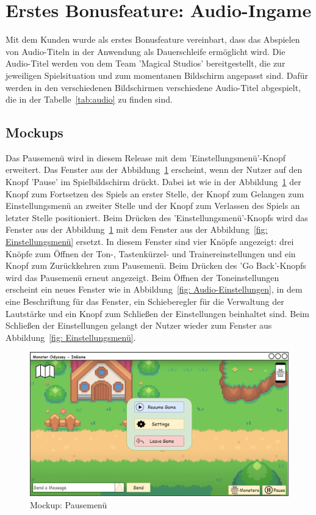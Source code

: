 \section{Erstes Bonusfeature: Audio-Ingame}\label{sec:audio-ingame}
Mit dem Kunden wurde als erstes Bonusfeature vereinbart, dass das Abspielen von Audio-Titeln in der Anwendung als Dauerschleife ermöglicht wird. 
Die Audio-Titel werden von dem Team 'Magical Studios' bereitgestellt, die zur jeweiligen Spielsituation und zum momentanen Bildschirm angepasst sind.
Dafür werden in den verschiedenen Bildschirmen verschiedene Audio-Titel abgespielt, die in der Tabelle~\ref{tab:audio} zu finden sind.
\subsection{Mockups}\label{subsec:mockups-audio-ingame}
Das Pausemenü wird in diesem Release mit dem 'Einstellungsmenü'-Knopf erweitert.
Das Fenster aus der Abbildung~\ref{fig: Pausemenü} erscheint, wenn der Nutzer auf den Knopf 'Pause' im Spielbildschirm drückt. 
Dabei ist wie in der Abbildung~\ref{fig: Pausemenü} der Knopf zum Fortsetzen des Spiels an erster Stelle, der Knopf zum Gelangen zum Einstellungsmenü an zweiter Stelle und der Knopf zum Verlassen des Spiels an letzter Stelle positioniert.
Beim Drücken des 'Einstellungsmenü'-Knopfs wird das Fenster aus der Abbildung~\ref{fig: Pausemenü} mit dem Fenster aus der Abbildung~\ref{fig: Einstellungsmenü} ersetzt. 
In diesem Fenster sind vier Knöpfe angezeigt: drei Knöpfe zum Öffnen der Ton-, Tastenkürzel- und Trainereinstellungen und ein Knopf zum Zurückkehren zum Pausemenü. Beim Drücken des 'Go Back'-Knopfs wird das Pausemenü erneut angezeigt.
Beim Öffnen der Toneinstellungen erscheint ein neues Fenster wie in Abbildung~\ref{fig: Audio-Einstellungen}, in dem eine Beschriftung für das Fenster, ein Schieberegler für die Verwaltung der Lautstärke und ein Knopf zum Schließen der Einstellungen beinhaltet sind. Beim Schließen der Einstellungen gelangt der Nutzer wieder zum Fenster aus Abbildung~\ref{fig: Einstellungsmenü}.
\begin{figure}[H]
    \center
    \includegraphics[scale=\scale]{images/mockups/Bonusfeatures/AudioIngame/IngameSettings.png}
    \caption{Mockup: Pausemenü}
    \label{fig: Pausemenü}
\end{figure}
